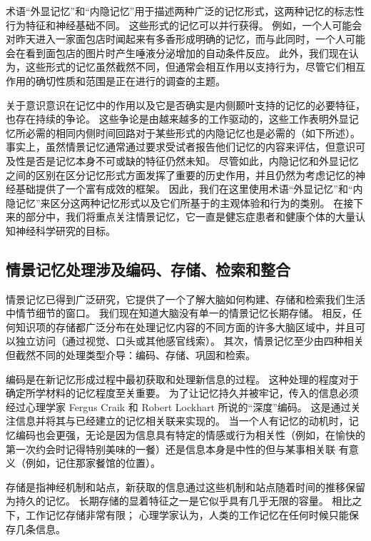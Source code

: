 术语“外显记忆”和“内隐记忆”用于描述两种广泛的记忆形式，这两种记忆的标志性行为特征和神经基础不同。
这些形式的记忆可以并行获得。
例如，一个人可能会对昨天进入一家面包店时闻起来有多香形成明确的记忆，而与此同时，一个人可能会在看到面包店的图片时产生唾液分泌增加的自动条件反应。
此外，我们现在认为，这些形式的记忆虽然截然不同，但通常会相互作用以支持行为，尽管它们相互作用的确切性质和范围是正在进行的调查的主题。


关于意识意识在记忆中的作用以及它是否确实是内侧颞叶支持的记忆的必要特征，也存在持续的争论。
这些争论是由越来越多的工作驱动的，这些工作表明外显记忆所必需的相同内侧时间回路对于某些形式的内隐记忆也是必需的（如下所述）。
事实上，虽然情景记忆通常通过要求受试者报告他们记忆的内容来评估，但意识可及性是否是记忆本身不可或缺的特征仍然未知。
尽管如此，内隐记忆和外显记忆之间的区别在区分记忆形式方面发挥了重要的历史作用，并且仍然为考虑记忆的神经基础提供了一个富有成效的框架。
因此，我们在这里使用术语“外显记忆”和“内隐记忆”来区分这两种记忆形式以及它们所基于的主观体验和行为的类别。
在接下来的部分中，我们将重点关注情景记忆，它一直是健忘症患者和健康个体的大量认知神经科学研究的目标。



\subsection{情景记忆处理涉及编码、存储、检索和整合}

情景记忆已得到广泛研究，它提供了一个了解大脑如何构建、存储和检索我们生活中情节细节的窗口。
我们现在知道大脑没有单一的情景记忆长期存储。
相反，任何知识项的存储都广泛分布在处理记忆内容的不同方面的许多大脑区域中，并且可以独立访问（通过视觉、口头或其他感官线索）。
其次，情景记忆至少由四种相关但截然不同的处理类型介导：编码、存储、巩固和检索。


编码是在新记忆形成过程中最初获取和处理新信息的过程。
这种处理的程度对于确定所学材料的记忆程度至关重要。
为了让记忆持久并被牢记，传入的信息必须经过心理学家 Fergus Craik 和 Robert Lockhart 所说的“深度”编码。
这是通过关注信息并将其与已经建立的记忆相关联来实现的。
当一个人有记忆的动机时，记忆编码也会更强，无论是因为信息具有特定的情感或行为相关性（例如，在愉快的第一次约会时记得特别美味的一餐）还是信息本身是中性的但与某事相关联 有意义（例如，记住那家餐馆的位置）。


存储是指神经机制和站点，新获取的信息通过这些机制和站点随着时间的推移保留为持久的记忆。
长期存储的显着特征之一是它似乎具有几乎无限的容量。
相比之下，工作记忆存储非常有限；
心理学家认为，人类的工作记忆在任何时候只能保存几条信息。


